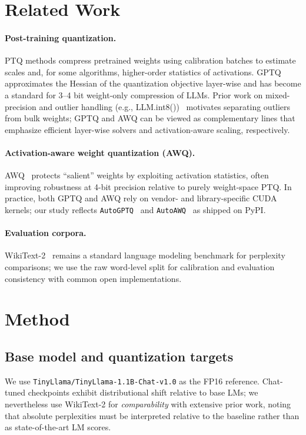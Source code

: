 \documentclass[11pt]{article}
\begin{document}
\section{Related Work}
\paragraph{Post-training quantization.}
PTQ methods compress pretrained weights using calibration batches to estimate scales and, for some algorithms,
higher-order statistics of activations.
GPTQ~\citep{frantar2023gptq} approximates the Hessian of the quantization objective layer-wise and has become a
standard for 3--4 bit weight-only compression of LLMs.
Prior work on mixed-precision and outlier handling (e.g., LLM.int8())~\citep{dettmers2022llmint8} motivates
separating outliers from bulk weights; GPTQ and AWQ can be viewed as complementary lines that emphasize
efficient layer-wise solvers and activation-aware scaling, respectively.

\paragraph{Activation-aware weight quantization (AWQ).}
AWQ~\citep{lin2023awq} protects ``salient'' weights by exploiting activation statistics, often improving robustness
at 4-bit precision relative to purely weight-space PTQ.
In practice, both GPTQ and AWQ rely on vendor- and library-specific CUDA kernels; our study reflects
\texttt{AutoGPTQ}~\citep{pan2024autogptq} and \texttt{AutoAWQ}~\citep{hansen2024autoawq} as shipped on PyPI.

\paragraph{Evaluation corpora.}
WikiText-2~\citep{merity2016pointer} remains a standard language modeling benchmark for perplexity comparisons;
we use the raw word-level split for calibration and evaluation consistency with common open implementations.

\section{Method}
\subsection{Base model and quantization targets}
We use \texttt{TinyLlama/TinyLlama-1.1B-Chat-v1.0} as the FP16 reference.
Chat-tuned checkpoints exhibit distributional shift relative to base LMs; we nevertheless use WikiText-2 for
\emph{comparability} with extensive prior work, noting that absolute perplexities must be interpreted relative to
the baseline rather than as state-of-the-art LM scores.
\end{document}
